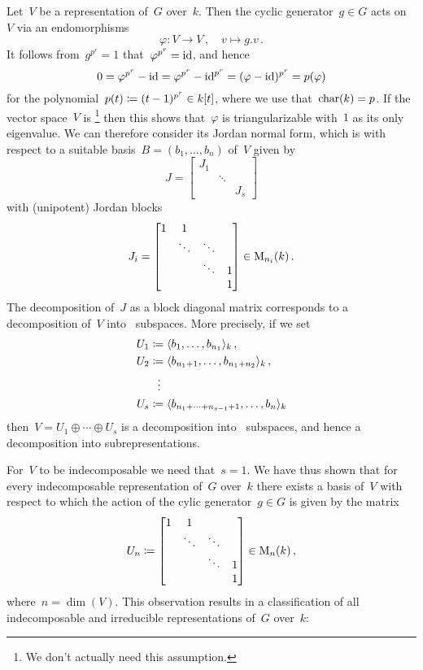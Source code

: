 Let~$V$ be a representation of~$G$ over~$k$.
Then the cyclic generator~$g \in G$ acts on~$V$ via an endomorphisms
\[
          \varphi
  \colon  V
  \to     V \,,
  \quad   v
  \mapsto g.v \,.
\]
It follows from~$g^{p^r} = 1$ that~$\varphi^{p^r} = \operatorname{id}$, and hence
\[
    0
  = \varphi^{p^r} - \operatorname{id}
  = \varphi^{p^r} - \operatorname{id}^{p^r}
  = (\varphi - \operatorname{id})^{p^r}
  = p(\varphi)
\]
for the polynomial~$p(t) \coloneqq (t-1)^{p^r} \in k[t]$, where we use that~$\operatorname{char}(k) = p$.
If the vector space~$V$ is {\fd}\footnote{We don’t actually need this assumption.} then this shows that~$\varphi$ is triangularizable with~$1$ as its only eigenvalue.
We can therefore consider its Jordan normal form, which is with respect to a suitable basis~$B = (b_1, \dotsc, b_n)$ of~$V$ given by
\[
    J
  = \begin{bmatrix}
      J_1 &         &       \\
          & \ddots  &       \\
          &         & J_s
    \end{bmatrix}
\]
with (unipotent) Jordan blocks
\[
    J_i
  = \begin{bmatrix}
      1 &       1 &         &   \\
        & \ddots  & \ddots  &   \\
        &         & \ddots  & 1 \\
        &         &         & 1
    \end{bmatrix}
  \in \operatorname{M}_{n_i}(k) \,.
\]
The decomposition of~$J$ as a block diagonal matrix corresponds to a decomposition of~$V$ into~ subspaces.
More precisely, if we set
\begin{align*}
            U_1
  &\coloneqq \langle b_1, \dotsc, b_{n_1}\rangle_k  \,, \\
            U_2
  &\coloneqq \langle b_{n_1 + 1}, \dotsc, b_{n_1 + n_2}\rangle_k \,,  \\
  &\;\;\,\vdots  \\
            U_s
  &\coloneqq \langle b_{n_1 + \dotsb + n_{s-1} + 1}, \dotsc, b_n\rangle_k
\end{align*}
then~$V = U_1 \oplus \dotsb \oplus U_s$ is a decomposition into~ subspaces, and hence a decomposition into subrepresentations.

For~$V$ to be indecomposable we need that~$s = 1$.
We have thus shown that for every {\fd} indecomposable representation of~$G$ over~$k$ there exists a basis of~$V$ with respect to which the action of the cylic generator~$g \in G$ is given by the matrix
\[
  U_n
  \coloneqq
  \begin{bmatrix}
    1 &       1 &         &   \\
      & \ddots  & \ddots  &   \\
      &         & \ddots  & 1 \\
      &         &         & 1
  \end{bmatrix}
  \in \operatorname{M}_{n}(k) \,,
\]
where~$n = \dim(V)$.
This observation results in a classification of all~{\fd} indecomposable and irreducible representations of~$G$ over~$k$:


